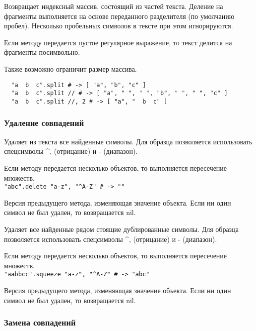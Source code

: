 \begin{methodlist}
  Возвращает индексный массив, состоящий из частей текста. Деление на фрагменты выполняется на основе переданного разделителя (по умолчанию пробел). Несколько пробельных символов в тексте при этом игнорируются.

  Если методу передается пустое регулярное выражение, то текст делится на фрагменты посимвольно.

  Также возможно ограничит размер массива.
  \begin{verbatim}
  "a  b  c".split # -> [ "a", "b", "c" ]
  "a  b  c".split // # -> [ "a", " ", " ", "b", " ", " ", "c" ]
  "a  b  c".split //, 2 # -> [ "a", "  b  c" ]
  \end{verbatim}
\end{methodlist}

\subsubsection*{Удаление совпадений}

\begin{methodlist}
  Удаляет из текста все найденные символы. Для образца позволяется использовать спецсимволы \textasciicircum\-, (отрицание) и - (диапазон).

  Если методу передается несколько объектов, то выполняется пересечение множеств. 
  \\\verb!"abc".delete "a-z", "^A-Z" # -> ""!

  Версия предыдущего метода, изменяющая значение объекта. Если ни один символ не был удален, то возвращается nil.

  Удаляет все найденные рядом стоящие дублированные символы. Для образца позволяется использовать спецсимволы \textasciicircum\-, (отрицание) и - (диапазон).

  Если методу передается несколько объектов, то выполняется пересечение множеств.
  \\\verb!"aabbcc".squeeze "a-z", "^A-Z" # -> "abc"!

  Версия предыдущего метода, изменяющая значение объекта. Если ни один символ не был удален, то возвращается nil.
\end{methodlist}

\subsubsection*{Замена совпадений}

